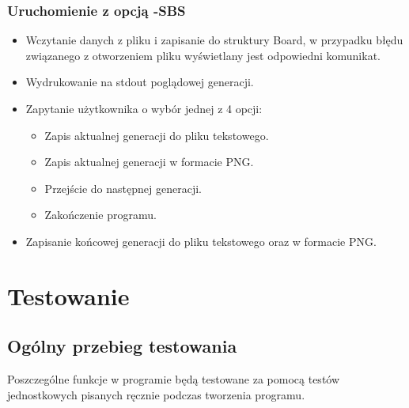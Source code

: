 \documentclass[12pt,a4paper,notitlepage]{report}
\begin{document}
\subsubsection{Uruchomienie z opcją -SBS}
\begin{itemize}
\item Wczytanie danych z pliku i zapisanie do struktury Board,
w przypadku błędu związanego z otworzeniem pliku wyświetlany jest odpowiedni komunikat.
\item Wydrukowanie na stdout poglądowej generacji.
\item Zapytanie użytkownika o wybór jednej z 4 opcji:
\begin{itemize}
\item Zapis aktualnej generacji do pliku tekstowego.
\item Zapis aktualnej generacji w formacie PNG.
\item Przejście do następnej generacji.
\item Zakończenie programu.
\end{itemize}
\item Zapisanie końcowej generacji do pliku tekstowego oraz w formacie PNG.
\end{itemize}
\section{Testowanie}
\subsection{Ogólny przebieg testowania}
Poszczególne funkcje w programie będą testowane za pomocą testów jednostkowych pisanych ręcznie podczas tworzenia programu.
\end{document}
